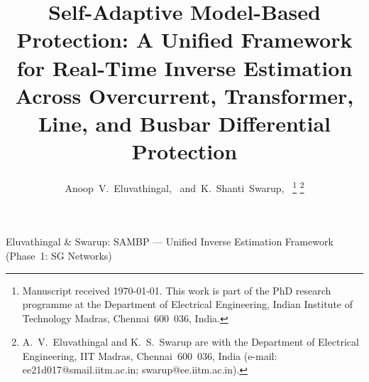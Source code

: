 \documentclass[journal,twoside,10pt]{IEEEtran}
\begin{document}

\title{Self-Adaptive Model-Based Protection: A Unified Framework
       for Real-Time Inverse Estimation Across Overcurrent,
       Transformer, Line, and Busbar Differential Protection}

\author{Anoop~V.~Eluvathingal,~
        and~K.~Shanti~Swarup,~%
\thanks{Manuscript received \today.
        This work is part of the PhD research programme at the Department of
        Electrical Engineering, Indian Institute of Technology Madras,
        Chennai~600~036, India.}%
\thanks{A.~V.~Eluvathingal and K.~S.~Swarup are with the Department of
        Electrical Engineering, IIT Madras, Chennai~600~036, India
        (e-mail: ee21d017@smail.iitm.ac.in; swarup@ee.iitm.ac.in).}}

%
{Eluvathingal \& Swarup: SAMBP — Unified Inverse Estimation Framework (Phase~1: SG Networks)}

\maketitle
\end{document}
